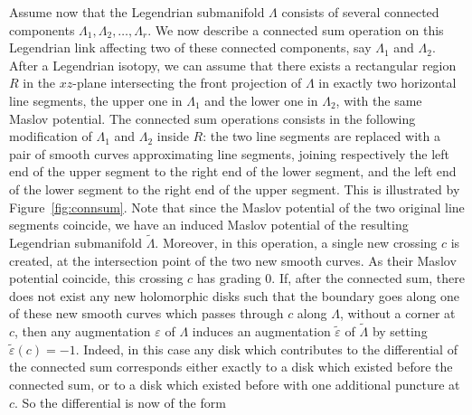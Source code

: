 \documentclass[11pt]{amsart}
\theoremstyle{plain}
\theoremstyle{remark}
\numberwithin{equation}{section}
\begin{document}
Assume now that the Legendrian submanifold $\Lambda$ consists of several connected components $\Lambda_1, \Lambda_2, \ldots, \Lambda_r$.
We now describe a connected sum operation on this Legendrian link affecting two of these connected components, say $\Lambda_1$ and $\Lambda_2$.
After a Legendrian isotopy, we can assume that there exists a rectangular region $R$ in the $xz$-plane intersecting the front projection of $\Lambda$ in
exactly two horizontal line segments, the upper one in $\Lambda_1$ and the lower one in $\Lambda_2$, with the same Maslov potential. The connected sum
operations consists in the following modification of $\Lambda_1$ and $\Lambda_2$ inside $R$: the two line segments are replaced with a pair of smooth curves
approximating line segments, joining respectively the left end of the upper segment to the right end of the lower segment, and the left end of the lower segment 
to the right end of the upper segment. This is illustrated by Figure~\ref{fig:connsum}. Note that since the Maslov potential of the two original line segments coincide,
we have an induced Maslov potential of the resulting Legendrian submanifold $\widetilde{\Lambda}$.
Moreover, in this operation, a single new crossing $c$ is created, at the intersection point of the two new smooth curves. As their Maslov 
potential coincide, this crossing $c$ has grading $0$. If, after the connected sum, there does not exist any new holomorphic disks such that the boundary goes along one of these new smooth curves which passes through $c$ along $\Lambda$, without a corner at $c$, then any augmentation $\varepsilon$ of $\Lambda$ induces an augmentation $\widetilde{\varepsilon}$ of
$\widetilde{\Lambda}$ by setting $\widetilde{\varepsilon}(c) = -1$. Indeed, in this case any disk which contributes to the differential of the connected sum corresponds either exactly to a disk which existed before the connected sum, or to a disk which existed before with one additional puncture at $c$. 
So the differential is now of the form
\end{document}

